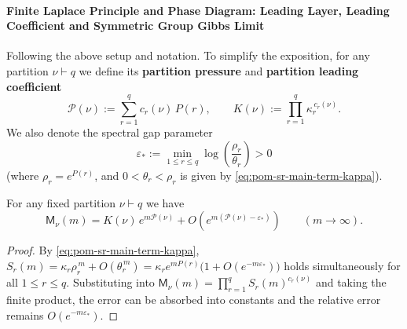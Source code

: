 
\paragraph{Finite Laplace Principle and Phase Diagram: Leading Layer, Leading Coefficient and Symmetric Group Gibbs Limit}
Following the above setup and notation.
To simplify the exposition, for any partition \(\nu\vdash q\) we define its \textbf{partition pressure} and \textbf{partition leading coefficient}
\[
\mathcal{P}(\nu):=\sum_{r=1}^{q} c_r(\nu)\,P(r),
\qquad
K(\nu):=\prod_{r=1}^{q}\kappa_r^{\,c_r(\nu)}.
\]
We also denote the spectral gap parameter
\[
\varepsilon_*:=\min_{1\le r\le q}\log\!\left(\frac{\rho_r}{\theta_r}\right)>0
\]
(where \(\rho_r=e^{P(r)}\), and \(0<\theta_r<\rho_r\) is given by \eqref{eq:pom-sr-main-term-kappa}).

\begin{lemma}\label{lem:pom-partition-monomial-exponential-main-term}
For any fixed partition \(\nu\vdash q\) we have
\[
\mathsf{M}_\nu(m)=K(\nu)\,e^{m\mathcal{P}(\nu)}+O\!\left(e^{m(\mathcal{P}(\nu)-\varepsilon_*)}\right)\qquad(m\to\infty).
\]
\end{lemma}
\begin{proof}
By \eqref{eq:pom-sr-main-term-kappa},
\(
S_r(m)=\kappa_r\rho_r^{\,m}+O(\theta_r^{\,m})
=\kappa_r e^{mP(r)}\bigl(1+O(e^{-m\varepsilon_*})\bigr)
\)
holds simultaneously for all \(1\le r\le q\).
Substituting into \(\mathsf{M}_\nu(m)=\prod_{r=1}^{q}S_r(m)^{c_r(\nu)}\) and taking the finite product, the error can be absorbed into constants and the relative error remains \(O(e^{-m\varepsilon_*})\).
\end{proof}


